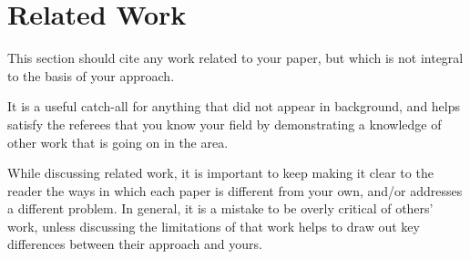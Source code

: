 \section{Related Work}
\label{sec:related-work}

This section should cite any work related to your paper,
but which is not integral to the basis of your approach.

It is a useful catch-all for anything that did not appear
in background, and helps satisfy the referees that you
know your field by demonstrating a knowledge of other
work that is going on in the area.

While discussing related work, it is important to keep
making it clear to the reader the ways in which each paper
is different from your own, and/or addresses a different
problem. In general, it is a mistake to be overly critical of
others' work, unless discussing the limitations of that
work helps to draw out key differences between their
approach and yours.
